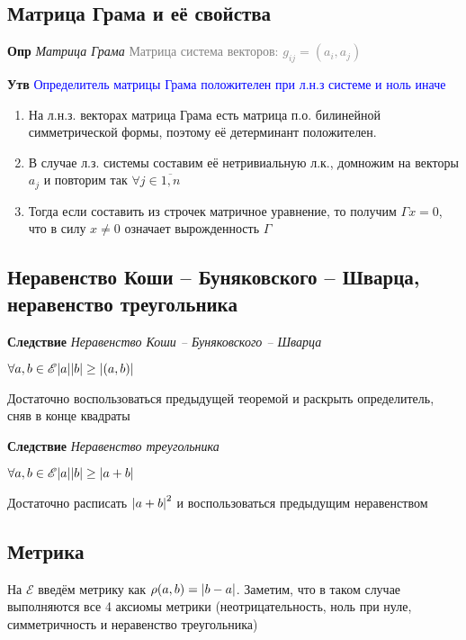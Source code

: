 \documentclass[a4paper, 14pt]{article}
\begin{document}
    \subsection{Матрица Грама и её свойства}

    \textbf{Опр} \textit{Матрица Грама} \textcolor{gray}{Матрица система векторов: $g_{ij} = (a_i, a_j)$}

    \textbf{Утв} \textcolor{blue}{Определитель матрицы Грама положителен при л.н.з системе и ноль иначе}

    \begin{enumerate}
        \item На л.н.з. векторах матрица Грама есть матрица п.о. билинейной симметрической формы, поэтому её
        детерминант положителен.
        \item В случае л.з. системы составим её нетривиальную л.к., домножим на векторы $a_j$ и повторим так $\forall j \in \overline{1, n}$
        \item Тогда если составить из строчек матричное уравнение, то получим $\Gamma x = 0$, что в силу $x \neq 0$
        означает вырожденность $\Gamma$
    \end{enumerate}

    \subsection{Неравенство Коши -- Буняковского -- Шварца, неравенство треугольника}

    \textbf{Следствие} \textit{Неравенство Коши -- Буняковского -- Шварца}

    \textcolor{blue}{$\forall a, b \in \mathscr{E} \abs{a} \abs{b} \geq \abs{(a, b)}$}

    Достаточно воспользоваться предыдущей теоремой и раскрыть определитель, сняв в конце квадраты

    \textbf{Следствие} \textit{Неравенство треугольника}

    \textcolor{blue}{$\forall a, b \in \mathscr{E} \abs{a} \abs{b} \geq \abs{a + b}$}

    Достаточно расписать $\abs{a+b}^2$ и воспользоваться предыдущим неравенством

    \subsection{Метрика}

    На $\mathscr{E}$ введём метрику как $\rho (a, b) = \abs{b - a}$.
    Заметим, что в таком случае выполняются все 4 аксиомы метрики (неотрицательность, ноль при нуле, симметричность и
    неравенство треугольника)
\end{document}
